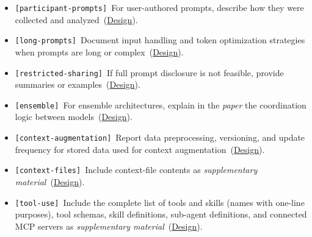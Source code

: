 \documentclass[smallextended]{svjour3}
\makeatletter
\newcommand{\should}{\textbf{should}\xspace}
\newcommand{\paper}{\emph{paper}\xspace}
\newcommand{\supplementarymaterial}{\emph{supplementary material}\xspace}
\newcommand{\paper}{\emph{paper}\xspace}
\newcommand{\supplementarymaterial}{\emph{supplementary material}\xspace}
\newcommand{\iconS}{\usebox{\iconSbox}\xspace}
\newcommand{\iconS}{○\xspace}
\newcommand{\condition}[1]{\texttt{\small[#1]}\,}
\newcommand{\condition}[1]{@@cond:#1@@}
\newcommand{\refdesign}{\hyperref[sec:report-system-and-prompt-design]{Design}}
\newcommand{\refdesign}{\href{/guidelines/report-system-and-prompt-design/}{Design}}
\makeatother
\begin{document}
\begin{appendices}
\begin{itemize}[label={},leftmargin=*]
    \item \iconS \condition{participant-prompts} For user-authored prompts, describe how they were collected and analyzed~(\refdesign).
    \item \iconS \condition{long-prompts} Document input handling and token optimization strategies when prompts are long or complex~(\refdesign).
    \item \iconS \condition{restricted-sharing} If full prompt disclosure is not feasible, provide summaries or examples~(\refdesign).
    \item \iconS \condition{ensemble} For ensemble architectures, explain in the \paper the coordination logic between models~(\refdesign).
    \item \iconS \condition{context-augmentation} Report data preprocessing, versioning, and update frequency for stored data used for context augmentation~(\refdesign).
    \item \iconS \condition{context-files} Include context-file contents as \supplementarymaterial~(\refdesign).
    \item \iconS \condition{tool-use} Include the complete list of tools and skills (names with one-line purposes), tool schemas, skill definitions, sub-agent definitions, and connected MCP servers as \supplementarymaterial~(\refdesign).
\end{itemize}


\end{appendices}
\end{document}
